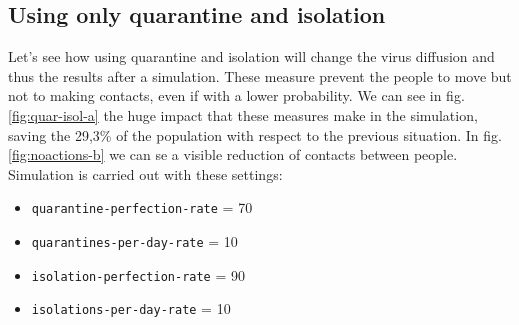 \documentclass[12pt]{llncs}
\begin{document}
\subsection{Using only quarantine and isolation}
Let's see how using quarantine and isolation will change the virus diffusion and thus the results after a simulation. These measure prevent the people to move but not to making contacts, even if with a lower probability. We can see in fig. \ref{fig:quar-isol-a} the huge impact that these measures make in the simulation, saving the 29,3\% of the population with respect to the previous situation. In fig. \ref{fig:noactions-b} we can se a visible reduction of contacts between people. Simulation is carried out with these settings:
\begin{itemize}
\item \texttt{quarantine-perfection-rate} = 70
\item \texttt{quarantines-per-day-rate} = 10
\item \texttt{isolation-perfection-rate} = 90
\item \texttt{isolations-per-day-rate} = 10
\end{itemize}
\end{document}
